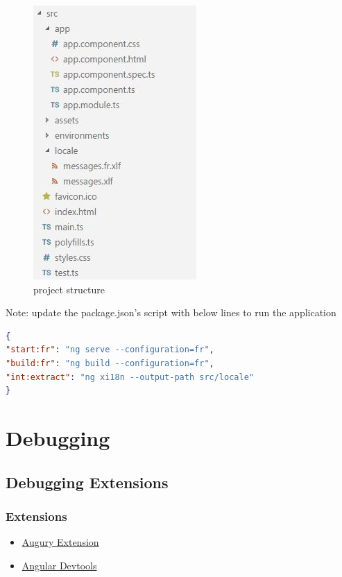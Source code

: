 \documentclass{report}
\begin{document}
\begin{figure}[h]
	\centerline{\includegraphics{intern.jpg}}
	\caption{project structure}
	\label{project structure}
\end{figure}
Note: update the package.json's script with below lines to run the application
\begin{lstlisting}[language=json, caption=package.json]
{
"start:fr": "ng serve --configuration=fr",
"build:fr": "ng build --configuration=fr",
"int:extract": "ng xi18n --output-path src/locale"
}
\end{lstlisting}
\chapter{Debugging}
\section{Debugging Extensions}
\subsection{Extensions}
\begin{itemize}
	\item{\href{https://augury.rangle.io/}{Augury Extension}}
	\item{\href{https://angular.io/guide/devtools}{Angular Devtools}}
\end{itemize}
\end{document}
